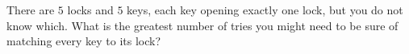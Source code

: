 There are $5$ locks and $5$ keys, each key opening exactly one lock, but you do not know which. What is the greatest number of tries you might need to be sure of matching every key to its lock?
